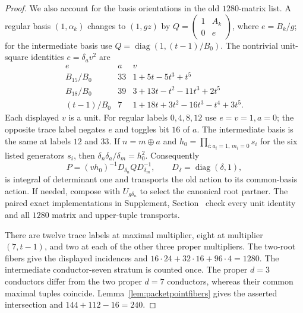 \begin{proof}
We also account for the basis orientations in the old $1280$-matrix
list.  A regular basis $(1,\alpha_k)$ changes to $(1,gz)$ by
$Q=\left(\begin{smallmatrix}1&A_k\\0&e\end{smallmatrix}\right)$,
where $e=B_k/g$; for the intermediate basis use
$Q=\operatorname{diag}(1,(t-1)/B_0)$.  The nontrivial unit-square
identities $e=\delta_a v^2$ are
\[
\begin{array}{c|r|l}
 e&a&v\\\hline
 B_{15}/B_0&33&1+5t-5t^3+t^5\\
 B_{18}/B_0&39&3+13t-t^2-11t^3+2t^5\\
 (t-1)/B_0&7&1+18t+3t^2-16t^3-t^4+3t^5.
\end{array}
\]
Each displayed $v$ is a unit.  For regular labels $0,4,8,12$ use
$e=v=1,a=0$; the opposite trace label negates $e$ and toggles bit $16$
of $a$.  The intermediate basis is the same at labels $12$ and $33$.
If $n=m\mathbin{\oplus}a$ and
$h_0=\prod_{i:a_i=1,\,m_i=0}s_i$ for the six listed generators $s_i$,
then $\delta_n\delta_a/\delta_m=h_0^2$.  Consequently
\[
 P=(vh_0)^{-1}D_{\delta_n}QD_{\delta_m}^{-1},
 \qquad D_\delta=\operatorname{diag}(\delta,1),
\]
is integral of determinant one and transports the old action to its
common-basis action.  If needed, compose with $U_{g\delta_n}$ to
select the canonical root partner.  The paired exact implementations
in Supplement, Section~ check every unit identity and all
$1280$ matrix and upper-tuple transports.

There are twelve trace labels at maximal multiplier, eight at
multiplier $(7,t-1)$, and two at each of the other three proper
multipliers.  The two-root fibers give the displayed incidences and
$16\cdot24+32\cdot16+96\cdot4=1280$.
The intermediate conductor-seven stratum is counted once.
The proper $d=3$ conductors differ from the two proper $d=7$
conductors, whereas their common maximal tuples coincide.
Lemma~\ref{lem:packetpointfibers} gives the asserted intersection
and $144+112-16=240$.
\end{proof}

